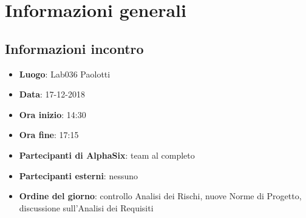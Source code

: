 \newcommand{\documento}{\VE}
\newcommand{\nomedocumentofisico}{VE\_17\_12\_2018.pdf}
\newcommand{\redazione}{\LC}
\newcommand{\verifica}{\CV}
\newcommand{\approvazione}{\MM}
\newcommand{\versione}{1.0.0}
\newcommand{\uso}{Esterno}
\newcommand{\destinateTo}{\TV, \\ & \RC, \\ & \II}
\newcommand{\datacreazione}{18 dicembre 2018}
\newcommand{\datamodifica}{19 dicembre 2018}
\newcommand{\stato}{Approvato}

\def\TABELLE{false}	%
\def\FIGURE{false} 	%






    

    
    
	
    
    \section{Informazioni generali}
		\subsection{Informazioni incontro}
			\begin{itemize}
				\item { \textbf{Luogo}: Lab036 Paolotti}
				\item { \textbf{Data}: 17-12-2018}
				\item { \textbf{Ora inizio}: 14:30}
				\item { \textbf{Ora fine}: 17:15}
				\item { \textbf{Partecipanti di AlphaSix}: team al completo}
				\item { \textbf{Partecipanti esterni}: nessuno}
				\item { \textbf{Ordine del giorno}: controllo Analisi dei Rischi, nuove Norme di Progetto, discussione sull'Analisi dei Requisiti}
			\end{itemize}

